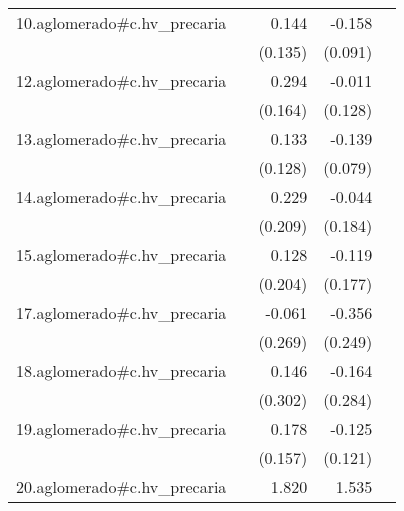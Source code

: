 {\begin{longtable}{l*{4}{D{.}{.}{-1}}}
\addlinespace
10.aglomerado#c.hv\_precaria&                     &       0.144         &      -0.158         &                     \\
            &                     &     (0.135)         &     (0.091)         &                     \\
\addlinespace
12.aglomerado#c.hv\_precaria&                     &       0.294         &      -0.011         &                     \\
            &                     &     (0.164)         &     (0.128)         &                     \\
\addlinespace
13.aglomerado#c.hv\_precaria&                     &       0.133         &      -0.139         &                     \\
            &                     &     (0.128)         &     (0.079)         &                     \\
\addlinespace
14.aglomerado#c.hv\_precaria&                     &       0.229         &      -0.044         &                     \\
            &                     &     (0.209)         &     (0.184)         &                     \\
\addlinespace
15.aglomerado#c.hv\_precaria&                     &       0.128         &      -0.119         &                     \\
            &                     &     (0.204)         &     (0.177)         &                     \\
\addlinespace
17.aglomerado#c.hv\_precaria&                     &      -0.061         &      -0.356         &                     \\
            &                     &     (0.269)         &     (0.249)         &                     \\
\addlinespace
18.aglomerado#c.hv\_precaria&                     &       0.146         &      -0.164         &                     \\
            &                     &     (0.302)         &     (0.284)         &                     \\
\addlinespace
19.aglomerado#c.hv\_precaria&                     &       0.178         &      -0.125         &                     \\
            &                     &     (0.157)         &     (0.121)         &                     \\
\addlinespace
20.aglomerado#c.hv\_precaria&                     &       1.820\sym{***}&       1.535\sym{***}&                     \\

\end{longtable}}

